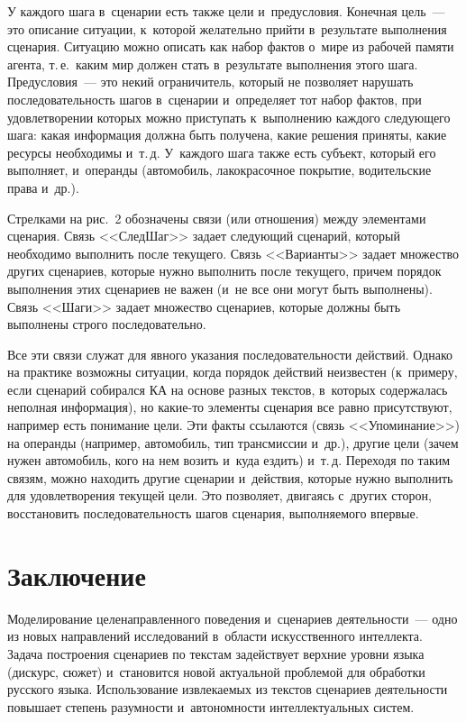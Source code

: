   \begin{multicols}{2}
  
  У каждого шага в~сценарии есть также цели и~предусловия. Конечная цель~--- 
это описание ситуации, к~которой желательно прийти в~результате выполнения 
сценария. Ситуацию можно описать как набор фактов о~мире из рабочей памяти 
агента, т.\,е.\ каким мир должен стать в~результате выполнения этого шага. 
Предусловия~--- это некий ограничитель, который не позволяет нарушать 
последовательность шагов в~сценарии и~определяет тот набор фактов, при 
удовлетворении которых можно приступать к~выполнению каждого 
сле\-ду\-юще\-го шага: какая информация должна быть получена, какие решения 
приняты, какие ресурсы необходимы и~т.\,д. У~каждого шага также есть 
субъект, который его выполняет, и~операнды (автомобиль, лакокрасочное 
покрытие, водительские права и~др.). 
  
  Стрелками на рис.~2 обозначены связи (или отношения) между элементами 
сценария. Связь <<СледШаг>> задает следующий сценарий, который 
необходимо выполнить после текущего. Связь <<Варианты>> задает 
множество других сценариев, которые нужно выполнить после текущего, 
причем порядок выполнения этих сценариев не важен (и~не все они могут быть 
выполнены). Связь <<Шаги>> задает множество сценариев, которые должны 
быть выполнены строго последовательно. 

Все эти связи служат для явного 
указания последовательности действий. Однако на практике возможны 
ситуации, когда порядок действий неизвестен (к~примеру, если сценарий 
собирался КА на основе разных текс\-тов, в~которых 
содержалась неполная информация), но ка\-кие-то элементы сценария все равно 
присутствуют, например есть понимание цели. Эти факты ссылаются (связь 
<<Упоминание>>) на операнды (например, автомобиль, тип трансмиссии 
и~др.), другие цели (зачем нужен автомобиль, кого на нем возить и~куда ездить) 
и~т.\,д. Переходя по таким связям, можно находить другие сценарии 
и~действия, которые нужно выполнить для удовле\-тво\-ре\-ния текущей цели. Это 
позволяет, двигаясь с~других сторон, восстановить по\-сле\-до\-ва\-тель\-ность шагов 
сценария, выполняемого впервые.

\section{Заключение}

  Моделирование целенаправленного поведения и~сценариев де\-я\-тель\-ности~--- 
одно из новых на\-прав\-ле\-ний исследований в~об\-ласти искусственного 
интеллекта. Задача по\-стро\-ения сценариев по текстам задействует верхние 
уровни языка (дискурс, сюжет) и~становится новой актуальной проблемой для 
обработки русского языка. Использование извле\-ка\-емых из текстов сценариев 
де\-я\-тель\-ности повышает степень ра\-зум\-ности и~ав\-то\-ном\-ности интеллектуальных 
систем.
  

\end{multicols}
